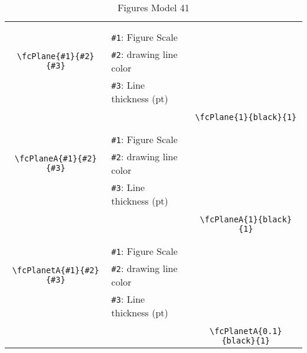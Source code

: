 \documentclass[x11names]{article}
\begin{document}
\begin{table}[H]
\begin{tabular}{|c|l|c|}
	&&\multirow{5}{*}{\fcPlane{1}{black}{1}}\\	&&\\	&\verb|#1|: Figure Scale &\\	\verb|\fcPlane{#1}{#2}{#3}|&	\verb|#2|: drawing line color &\\	&\verb|#3|: Line thickness (pt) &\\ &&\\&&	\verb|\fcPlane{1}{black}{1}|\\\hline 	
	&&\multirow{5}{*}{\fcPlaneA{1}{black}{1}}\\	&&\\	&\verb|#1|: Figure Scale &\\	\verb|\fcPlaneA{#1}{#2}{#3}|&	\verb|#2|: drawing line color &\\	&\verb|#3|: Line thickness (pt) &\\ &&\\&&	\verb|\fcPlaneA{1}{black}{1}|\\\hline 	
	&&\multirow{5}{*}{\fcPlanetA{0.1}{black}{1}}\\	&&\\	&\verb|#1|: Figure Scale &\\	\verb|\fcPlanetA{#1}{#2}{#3}|&	\verb|#2|: drawing line color &\\	&\verb|#3|: Line thickness (pt) &\\ &&\\&&	\verb|\fcPlanetA{0.1}{black}{1}|\\\hline 	\hline\end{tabular}\caption{Figures Model 41}\label{tab41}\end{table}
\end{document}
